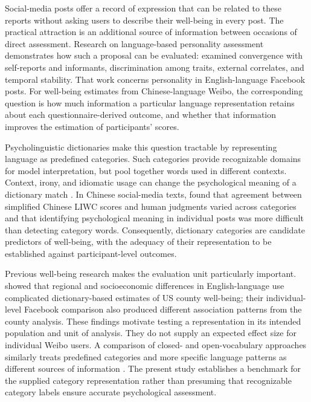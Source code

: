 Social-media posts offer a record of expression that can be related to these reports without asking users to describe their well-being in every post. The practical attraction is an additional source of information between occasions of direct assessment. Research on language-based personality assessment demonstrates how such a proposal can be evaluated: \citet{park2015} examined convergence with self-reports and informants, discrimination among traits, external correlates, and temporal stability. That work concerns personality in English-language Facebook posts. For well-being estimates from Chinese-language Weibo, the corresponding question is how much information a particular language representation retains about each questionnaire-derived outcome, and whether that information improves the estimation of participants' scores.

Psycholinguistic dictionaries make this question tractable by representing language as predefined categories. Such categories provide recognizable domains for model interpretation, but pool together words used in different contexts. Context, irony, and idiomatic usage can change the psychological meaning of a dictionary match \citep{tausczik2010}. In Chinese social-media texts, \citet{zhao2016} found that agreement between simplified Chinese LIWC scores and human judgments varied across categories and that identifying psychological meaning in individual posts was more difficult than detecting category words. Consequently, dictionary categories are candidate predictors of well-being, with the adequacy of their representation to be established against participant-level outcomes.

Previous well-being research makes the evaluation unit particularly important. \citet{jaidka2020} showed that regional and socioeconomic differences in English-language use complicated dictionary-based estimates of US county well-being; their individual-level Facebook comparison also produced different association patterns from the county analysis. These findings motivate testing a representation in its intended population and unit of analysis. They do not supply an expected effect size for individual Weibo users. A comparison of closed- and open-vocabulary approaches similarly treats predefined categories and more specific language patterns as different sources of information \citep{eichstaedt2021}. The present study establishes a benchmark for the supplied category representation rather than presuming that recognizable category labels ensure accurate psychological assessment.


